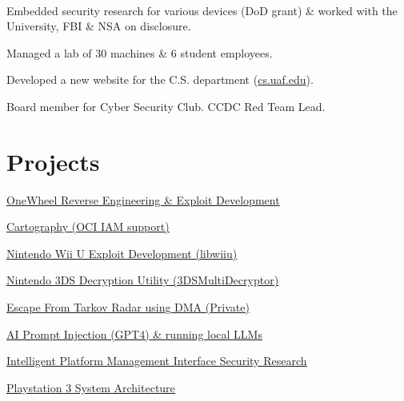 \documentclass[]{hieudo-build}
\begin{document}
\begin{minipage}[t]{0.65\textwidth}
		 \\
		\begin{tightemize}
			\item Embedded security research for various devices (DoD grant) \& worked with the University, FBI \& NSA on disclosure.
			\item Managed a lab of 30 machines \& 6 student employees.
			\item Developed a new website for the C.S. department (\href{https://www.cs.uaf.edu/}{cs.uaf.edu}).
			\item Board member for Cyber Security Club. CCDC Red Team Lead.
		\end{tightemize}
		
		\section{Projects}
		\vspace{\topsep} %
		\begin{tightemize}
			\item {\href{https://github.com/Relys/rewheel}{\underline{OneWheel Reverse Engineering \& Exploit Development}}}
			\item {\href{https://github.com/lyft/cartography}{\underline{Cartography (OCI IAM support)}}}
			\item {\href{https://github.com/wiiudev/libwiiu}{\underline{Nintendo Wii U Exploit Development (libwiiu)}}}
			\item {\href{https://gbatemp.net/threads/release-3ds_ctr_decryptor-void.370684/}{\underline{Nintendo 3DS Decryption Utility (3DS\textunderscore Multi\textunderscore Decryptor)}}}
			\item
			{\underline{Escape From Tarkov Radar using DMA (Private)}}
			\item
			{\underline{AI Prompt Injection (GPT4) \& running local LLMs}}
			\item {\href{https://scholarworks.alaska.edu/handle/11122/9761}{\underline{Intelligent Platform Management Interface Security Research}}}
			\item {\href{https://www.semanticscholar.org/paper/PlayStation-3-System-Architecture-Clayton/9f1819c0ab2370332e2ffcc3a5d1042301f3279ce}{\underline{Playstation 3 System Architecture}}}
		\end{tightemize}
		\sectionsep
	\end{minipage} 
	
\end{document}
